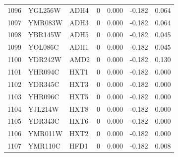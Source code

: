 \begin{longtable}{rllrrrr}
1096 & YGL256W & ADH4 & 0 & 0.000 & -0.182 & 0.064\\
1097 & YMR083W & ADH3 & 0 & 0.000 & -0.182 & 0.064\\
1098 & YBR145W & ADH5 & 0 & 0.000 & -0.182 & 0.045\\
1099 & YOL086C & ADH1 & 0 & 0.000 & -0.182 & 0.045\\
1100 & YDR242W & AMD2 & 0 & 0.000 & -0.182 & 0.130\\
1101 & YHR094C & HXT1 & 0 & 0.000 & -0.182 & 0.000\\
1102 & YDR345C & HXT3 & 0 & 0.000 & -0.182 & 0.000\\
1103 & YHR096C & HXT5 & 0 & 0.000 & -0.182 & 0.000\\
1104 & YJL214W & HXT8 & 0 & 0.000 & -0.182 & 0.000\\
1105 & YDR343C & HXT6 & 0 & 0.000 & -0.182 & 0.000\\
1106 & YMR011W & HXT2 & 0 & 0.000 & -0.182 & 0.000\\
1107 & YMR110C & HFD1 & 0 & 0.000 & -0.182 & 0.008\\
\hline
\end{longtable}
